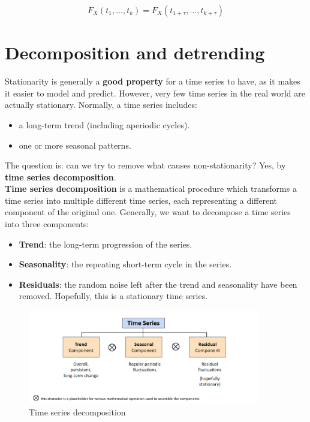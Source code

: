 \begin{equation}
    F_X(t_1, ..., t_k) = F_X(t_{1 + \tau}, ..., t_{k + \tau})
\end{equation}



\section{Decomposition and detrending}

Stationarity is generally a \textbf{good property} for a time series to have, as it
makes it easier to model and predict. However, very few time series in the real world
are actually stationary. Normally, a time series includes:
\begin{itemize}
    \item a long-term trend (including aperiodic cycles).
    \item one or more seasonal patterns.
\end{itemize}

The question is: can we try to remove what causes non-stationarity? Yes, 
by \textbf{time series decomposition}.\\

\textbf{Time series decomposition} is a mathematical procedure which transforms a
time series into multiple different time series, each representing a different
component of the original one. Generally, we want to decompose a time series into
three components:
\begin{itemize}
    \item \textbf{Trend}: the long-term progression of the series.
    \item \textbf{Seasonality}: the repeating short-term cycle in the series.
    \item \textbf{Residuals}: the random noise left after the trend and seasonality
    have been removed. Hopefully, this is a stationary time series.
\end{itemize}

\begin{figure}[H]
    \centering
    \includegraphics[width=0.9\textwidth]{figures/time_series_decomp.png}
    \caption{Time series decomposition}
    \label{fig:decomposition}
\end{figure}

